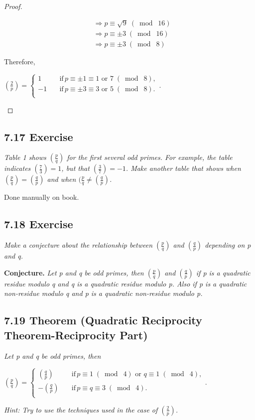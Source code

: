 \documentclass{article}
\begin{document}
\begin{proof}
\begin{itemize}
\begin{align*}
    && &\Longrightarrow p \equiv \sqrt{9} \;(\bmod\; 16) &&\\
    && &\Longrightarrow p \equiv \pm3 \;(\bmod\; 16) &&\\
    && &\Longrightarrow p \equiv \pm3 \;(\bmod\; 8) &&
\end{align*}
\end{itemize}
Therefore, 
\begin{center}
    $(\frac{2}{p}) = \begin{cases}
          1 \quad &\text{if} \, p \equiv \pm1 \equiv 1 \text{ or } 7\;(\bmod\; 8),\\
          -1 \quad &\text{if} \, p \equiv \pm3 \equiv 3 \text{ or } 5 \;(\bmod\; 8).\\
     \end{cases}$.
\end{center}
\end{proof}

\subsection*{7.17 Exercise} 
\quad \textit{Table 1 shows $(\frac{p}{q})$ for the first several odd primes. For example, the table indicates $(\frac{7}{3}) = 1$, but that $(\frac{3}{7}) = -1$. Make another table that shows when $(\frac{p}{q}) = (\frac{q}{p})$ and when $(\frac{p}{q} \neq (\frac{q}{p})$.}

Done manually on book.

\subsection*{7.18 Exercise} 
\quad \textit{Make a conjecture about the relationship between $(\frac{p}{q})$ and $(\frac{q}{p})$ depending on p and q.}

\textbf{Conjecture.} \textit{Let p and q be odd primes, then $(\frac{p}{q})$ and $(\frac{q}{p})$ if p is a quadratic residue modulo q and q is a quadratic residue modulo p. Also if p is a quadratic non-residue modulo q and p is a quadratic non-residue modulo p.}

\subsection*{7.19 Theorem (Quadratic Reciprocity Theorem-Reciprocity Part)} 
\quad \textit{Let p and q be odd primes, then}
\begin{center}
    $(\frac{p}{q}) = \begin{cases}
          (\frac{q}{p}) \quad &\text{if} \, p \equiv 1 \;(\bmod\; 4) \text{ or } q \equiv 1 \;(\bmod\; 4),\\
          -(\frac{q}{p}) \quad &\text{if} \, p \equiv q \equiv 3 \;(\bmod\; 4).\\
     \end{cases}$.
\end{center}
\textit{Hint: Try to use the techniques used in the case of $(\frac{2}{p})$.}
\end{document}
